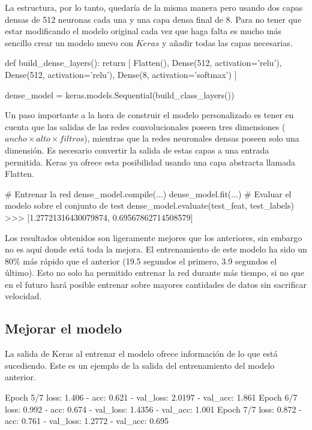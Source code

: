 La estructura, por lo tanto, quedaría de la misma manera pero usando dos capas densas de 512 neuronas cada una y una capa densa final de 8. Para no tener que estar modificando el modelo original cada vez que haga falta es mucho más sencillo crear un modelo nuevo con $Keras$ y añadir todas las capas necesarias.

\begin{python}
def build_dense_layers():
    return [
        Flatten(),
        Dense(512, activation='relu'),
        Dense(512, activation='relu'),
        Dense(8, activation='softmax')
    ]

dense_model = keras.models.Sequential(build_class_layers())
\end{python}

Un paso importante a la hora de construir el modelo personalizado es tener en cuenta que las salidas de las redes convolucionales poseen tres dimensiones ($ancho \times alto \times filtros$), mientras que la redes neuronales densas poseen solo una dimensión. Es necesario convertir la salida de estas capas a una entrada permitida. Keras ya ofrece esta posibilidad usando una capa abstracta llamada Flatten.

\begin{python}
# Entrenar la red
dense_model.compile(...)
dense_model.fit(...)
# Evaluar el modelo sobre el conjunto de test
dense_model.evaluate(test_feat, test_labels)
>>> [1.27721316430079874, 0.69567862714508579]
\end{python}

Los resultados obtenidos son ligeramente mejores que los anteriores, sin embargo no es aquí donde está toda la mejora. El entrenamiento de este modelo ha sido un 80\% más rápido que el anterior (19.5 segundos el primero, 3.9 segundos el último). Esto no solo ha permitido entrenar la red durante más tiempo, si no que en el futuro hará posible entrenar sobre mayores cantidades de datos sin sacrificar velocidad.

\subsection{Mejorar el modelo}

La salida de Keras al entrenar el modelo ofrece información de lo que está sucediendo. Este es un ejemplo de la salida del entrenamiento del modelo anterior.

\begin{python}
Epoch 5/7
loss: 1.406 - acc: 0.621 - val_loss: 2.0197 - val_acc: 1.861
Epoch 6/7
loss: 0.992 - acc: 0.674 - val_loss: 1.4356 - val_acc: 1.001
Epoch 7/7
loss: 0.872 - acc: 0.761 - val_loss: 1.2772 - val_acc: 0.695
\end{python}


